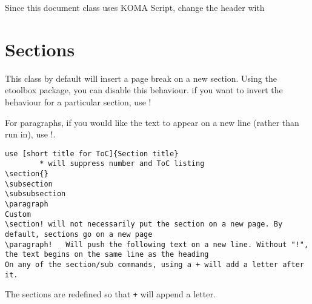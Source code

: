 \documentclass{\FormatDir corpboreportMulti}
\newcommand{\cmd}[1]{\texttt{\detokenize{#1}}}
\begin{document}
Since this document class uses KOMA Script, change the header with
\cmd{\lohead{}, \rohead{}}


\section{Sections}\label{s.sett}

This class by default will insert a page break on a new section.
Using the etoolbox package, you can disable this behaviour.
if you want to invert the behaviour for a particular section, use !

For paragraphs, if you would like the text to appear on a new line (rather than run in), use !.

\begin{lstlisting}
use [short title for ToC]{Section title}
		* will suppress number and ToC listing
\section{}
\subsection
\subsubsection
\paragraph
Custom
\section! will not necessarily put the section on a new page. By default, sections go on a new page
\paragraph!   Will push the following text on a new line. Without "!", the text begins on the same line as the heading
On any of the section/sub commands, using a + will add a letter after it.
\end{lstlisting}

The sections are redefined so that \texttt{+} will append a letter. \cmd{\reset[sub]sectionletter}
\end{document}
